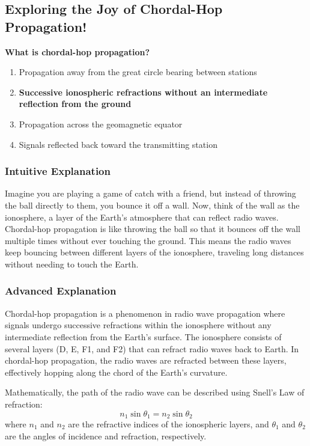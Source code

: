 \subsection{Exploring the Joy of Chordal-Hop Propagation!}

\begin{tcolorbox}[colback=gray!10!white,colframe=black!75!black,title=\textbf{E3B12}]
\textbf{What is chordal-hop propagation?}
\begin{enumerate}[label=\Alph*.]
    \item Propagation away from the great circle bearing between stations
    \item \textbf{Successive ionospheric refractions without an intermediate reflection from the ground}
    \item Propagation across the geomagnetic equator
    \item Signals reflected back toward the transmitting station
\end{enumerate}
\end{tcolorbox}

\subsubsection{Intuitive Explanation}
Imagine you are playing a game of catch with a friend, but instead of throwing the ball directly to them, you bounce it off a wall. Now, think of the wall as the ionosphere, a layer of the Earth's atmosphere that can reflect radio waves. Chordal-hop propagation is like throwing the ball so that it bounces off the wall multiple times without ever touching the ground. This means the radio waves keep bouncing between different layers of the ionosphere, traveling long distances without needing to touch the Earth.

\subsubsection{Advanced Explanation}
Chordal-hop propagation is a phenomenon in radio wave propagation where signals undergo successive refractions within the ionosphere without any intermediate reflection from the Earth's surface. The ionosphere consists of several layers (D, E, F1, and F2) that can refract radio waves back to Earth. In chordal-hop propagation, the radio waves are refracted between these layers, effectively hopping along the chord of the Earth's curvature.

Mathematically, the path of the radio wave can be described using Snell's Law of refraction:
\[
n_1 \sin \theta_1 = n_2 \sin \theta_2
\]
where \( n_1 \) and \( n_2 \) are the refractive indices of the ionospheric layers, and \( \theta_1 \) and \( \theta_2 \) are the angles of incidence and refraction, respectively.

